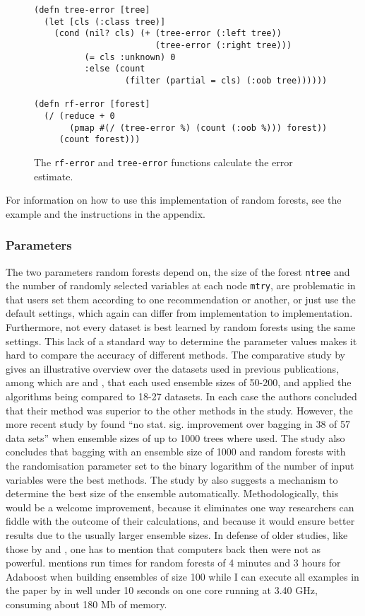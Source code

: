 \documentclass[a4paper,man,12pt,apacite,floatsintext,draftfirst]{apa6} %
\begin{document}
\begin{figure}[H]
\caption{The \texttt{rf-error} and \texttt{tree-error} functions calculate the error estimate.}
\begin{verbatim}
(defn tree-error [tree]
  (let [cls (:class tree)]
    (cond (nil? cls) (+ (tree-error (:left tree))
                        (tree-error (:right tree)))
          (= cls :unknown) 0
          :else (count
                  (filter (partial = cls) (:oob tree))))))

(defn rf-error [forest]
  (/ (reduce + 0
       (pmap #(/ (tree-error %) (count (:oob %))) forest))
     (count forest)))
\end{verbatim}
\end{figure}

For information on how to use this implementation of random forests,
see the example and the instructions in the appendix.

\subsubsection{Parameters}
The two parameters random forests depend on, the size of the forest
\texttt{ntree} and the number of randomly selected variables at each node
\texttt{mtry}, are problematic
in that users set them according to one recommendation or another,
or just use the default settings, which again can differ from implementation
to implementation.
Furthermore, not every dataset is best learned by random forests using the
same settings.
This lack of a standard way to determine the parameter values makes it hard
to compare the accuracy of different methods.
The comparative study by  gives an
illustrative overview over the datasets used in previous publications,
among which are  and ,
that each used ensemble sizes of 50-200, and applied the algorithms being
compared to 18-27 datasets.
In each case the authors concluded that their method was superior to the
other methods in the study.
However, the more recent study by  found
“no stat. sig. improvement over bagging in 38 of 57 data sets”
when ensemble sizes of up to 1000 trees where used.
The study also concludes that bagging with an ensemble size of 1000 and
random forests with the randomisation parameter set to the
binary logarithm of the number of input variables were the best methods.
The study by  also suggests a mechanism
to determine the best size of the ensemble automatically.
Methodologically, this would be a welcome improvement, because it eliminates
one way researchers can fiddle with the outcome of their calculations,
and because it would ensure better results due to the usually larger
ensemble sizes.
In defense of older studies, like those by  and
, one has to mention that
computers back then were not as powerful.
 mentions run times for random forests of 4 minutes
and 3 hours for Adaboost when building ensembles of size 100
while I can execute all examples in the paper by 
in well under 10 seconds on one core running at 3.40 GHz, consuming about 180 Mb
of memory.
\end{document}

